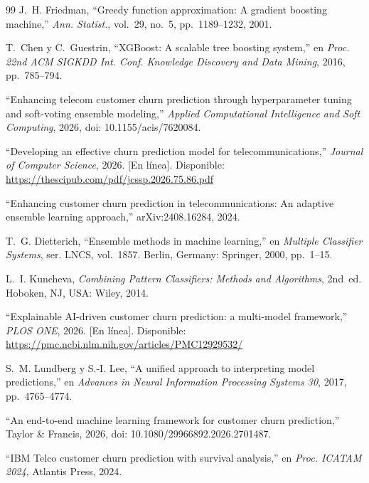 \documentclass[conference]{IEEEtran}
\begin{document}
\begin{thebibliography}{99}
J.~H. Friedman, ``Greedy function approximation: A gradient boosting machine,'' \emph{Ann. Statist.}, vol.~29, no.~5, pp.~1189--1232, 2001.

T.~Chen y C.~Guestrin, ``XGBoost: A scalable tree boosting system,'' en \emph{Proc. 22nd ACM SIGKDD Int. Conf. Knowledge Discovery and Data Mining}, 2016, pp.~785--794.

``Enhancing telecom customer churn prediction through hyperparameter tuning and soft-voting ensemble modeling,'' \emph{Applied Computational Intelligence and Soft Computing}, 2026, doi: 10.1155/acis/7620084.

``Developing an effective churn prediction model for telecommunications,'' \emph{Journal of Computer Science}, 2026. [En línea]. Disponible: \url{https://thescipub.com/pdf/jcssp.2026.75.86.pdf}

``Enhancing customer churn prediction in telecommunications: An adaptive ensemble learning approach,'' arXiv:2408.16284, 2024.

T.~G. Dietterich, ``Ensemble methods in machine learning,'' en \emph{Multiple Classifier Systems}, ser. LNCS, vol.~1857. Berlin, Germany: Springer, 2000, pp.~1--15.

L.~I. Kuncheva, \emph{Combining Pattern Classifiers: Methods and Algorithms}, 2nd~ed. Hoboken, NJ, USA: Wiley, 2014.

``Explainable AI-driven customer churn prediction: a multi-model framework,'' \emph{PLOS ONE}, 2026. [En línea]. Disponible: \url{https://pmc.ncbi.nlm.nih.gov/articles/PMC12929532/}

S.~M. Lundberg y S.-I. Lee, ``A unified approach to interpreting model predictions,'' en \emph{Advances in Neural Information Processing Systems 30}, 2017, pp.~4765--4774.

``An end-to-end machine learning framework for customer churn prediction,'' Taylor \& Francis, 2026, doi: 10.1080/29966892.2026.2701487.

``IBM Telco customer churn prediction with survival analysis,'' en \emph{Proc. ICATAM 2024}, Atlantis Press, 2024.


\end{thebibliography}
\end{document}
